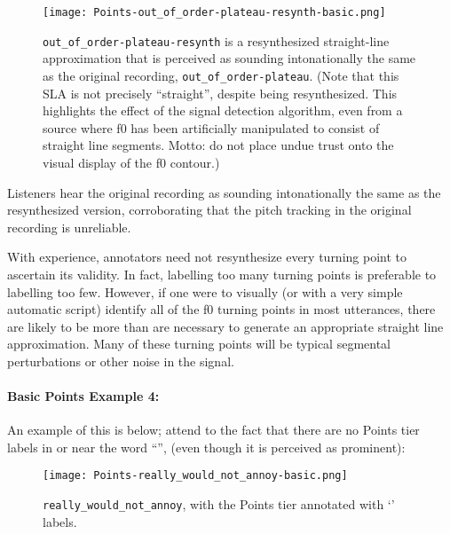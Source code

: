 \begin{figure}[H]
\centering
%
\texttt{[image: Points-out\_of\_order-plateau-resynth-basic.png]}
%
\caption[\texttt{out\_of\_order-plateau-resynth} is a resynthesized straight-line approximation that is perceived as sounding intonationally the same as the original recording, \texttt{out\_of\_order-plateau}.]{\texttt{out\_of\_order-plateau-resynth} is a resynthesized straight-line approximation that is perceived as sounding intonationally the same as the original recording, \texttt{out\_of\_order-plateau}. (Note that this SLA is not precisely “straight”, despite being resynthesized. This highlights the effect of the signal detection algorithm, even from a source where f0 has been artificially manipulated to consist of straight line segments. Motto: do not place undue trust onto the visual display of the f0 contour.)%
\label{fig:out_of_order-plateau Points basic resynth}%
%
}
\end{figure}

Listeners hear the original recording as sounding intonationally the same as the resynthesized version, corroborating that the pitch tracking in the original recording is unreliable.

With experience, annotators need not resynthesize every turning point to ascertain its validity. In fact, labelling too many turning points is preferable to labelling too few. However, if one were to visually (or with a very simple automatic script) identify all of the f0 turning points in most utterances, there are likely to be more than are necessary to generate an appropriate straight line approximation. Many of these turning points will be typical segmental perturbations or other noise in the signal.

\paragraph{Basic Points Example 4:\label{basic-points-example-4}}

An example of this is below; attend to the fact that there are no Points tier labels in or near the word “”, (even though it is perceived as prominent):

\begin{figure}[H]
\centering
%
\texttt{[image: Points-really\_would\_not\_annoy-basic.png]}
%
\caption{\texttt{really\_would\_not\_annoy}, with the Points tier annotated with ‘’ labels.%
\label{fig:really_would_not_annoy Points basic}%
%
}
\end{figure}

